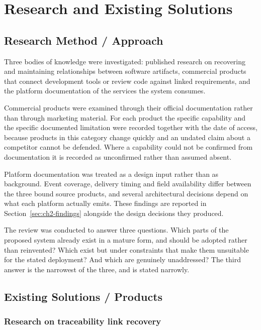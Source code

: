 \chapter{Research and Existing Solutions}

\section{Research Method / Approach}

Three bodies of knowledge were investigated: published research on recovering
and maintaining relationships between software artifacts, commercial products
that connect development tools or review code against linked requirements, and
the platform documentation of the services the system consumes.

Commercial products were examined through their official documentation rather
than through marketing material. For each product the specific capability and
the specific documented limitation were recorded together with the date of
access, because products in this category change quickly and an undated claim
about a competitor cannot be defended. Where a capability could not be confirmed
from documentation it is recorded as unconfirmed rather than assumed absent.

Platform documentation was treated as a design input rather than as background.
Event coverage, delivery timing and field availability differ between the three
bound source products, and several architectural decisions depend on what each
platform actually emits. These findings are reported in
Section~\ref{sec:ch2-findings} alongside the design decisions they produced.

The review was conducted to answer three questions. Which parts of the proposed
system already exist in a mature form, and should be adopted rather than
reinvented? Which exist but under constraints that make them unsuitable for the
stated deployment? And which are genuinely unaddressed? The third answer is the
narrowest of the three, and is stated narrowly.

\section{Existing Solutions / Products}

\subsection{Research on traceability link recovery}

